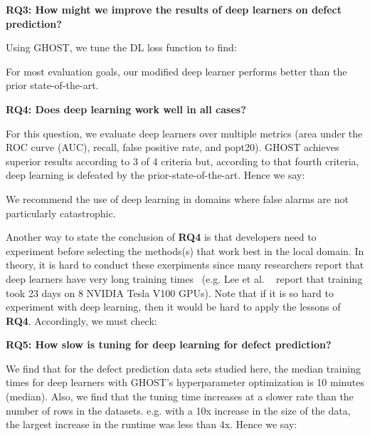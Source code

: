 \documentclass[10pt,compsoc,twocolumn]{IEEEtran}
\begin{document}
\textbf{RQ3: How might we improve the results of deep learners on defect prediction?}

Using GHOST, we tune the DL loss function to find:

\begin{blockquote}
    \noindent
 For most evaluation goals,
    our modified   deep learner performs better than the prior state-of-the-art.
\end{blockquote}


%


\textbf{RQ4: Does deep learning work well in all cases?}

For this question,
we evaluate deep learners over multiple metrics
(area under the ROC curve (AUC), recall, false positive rate, and popt20).  GHOST   achieves superior results according to 3 of 4 criteria but,
according to that fourth criteria, deep learning is 
defeated by the prior-state-of-the-art. Hence we say:

\begin{blockquote}
    \noindent
    We recommend the use of deep learning in domains where false alarms are not particularly catastrophic. 
\end{blockquote}
\noindent

Another way to state the conclusion of {\bf RQ4} is that
developers need to experiment  before selecting the methods(s) that work best  in the local domain. In theory, it is hard to conduct these exerpiments
since   many researchers report that deep learners have very long training times~\cite{lee2020biobert, brown2020language} (e.g. Lee et al. ~\cite{lee2020biobert} report that training took 23 days on 8 NVIDIA Tesla V100 GPUs). 
Note that if  it is so hard to experiment with deep learning,
then it would be hard to apply the lessons of {\bf RQ4}.
Accordingly, we must check:

\textbf{RQ5: How slow is tuning for 
deep learning for defect prediction?}


We find that for the defect prediction data sets studied here, the  median training times for deep learners  with GHOST's hyperparameter optimization is 10 minutes  (median).
Also,
we find that the tuning time increases at a slower rate than the number of rows in the datasets. e.g. with a 10x increase in the size of the data, the largest increase in the runtime was less than 4x. 
Hence we say:
\end{document}
